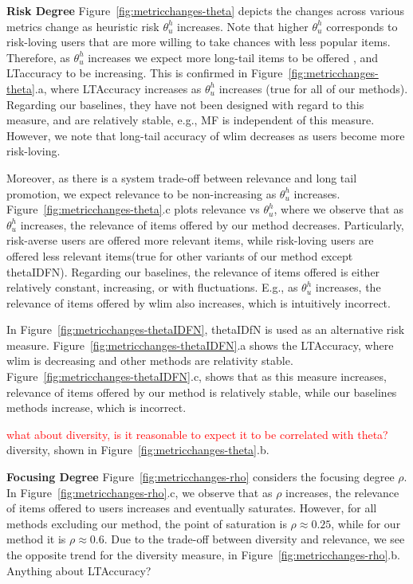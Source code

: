 \textbf{Risk Degree}
Figure~\ref{fig:metricchanges-theta} depicts the changes across various metrics change as heuristic risk $\theta_u^h$ increases. Note that higher $\theta_u^h$ corresponds to risk-loving users that are  more willing to take chances with less popular items. Therefore, as $\theta_u^h$ increases we expect more long-tail items to be offered , and LTaccuracy to be increasing.  This is confirmed in Figure~\ref{fig:metricchanges-theta}.a, where LTAccuracy increases as $\theta_u^h$ increases (true for all of our methods). Regarding our baselines,  they have not been designed with regard to this measure, and are relatively stable, e.g., MF is independent of this measure. However, we note that long-tail accuracy of wlim decreases as users become more risk-loving.

Moreover, as there is a system trade-off between relevance and long tail promotion,  we expect relevance to be non-increasing as  $\theta_u^h$ increases. Figure~\ref{fig:metricchanges-theta}.c plots relevance vs $\theta_u^h$, where we observe that as  $\theta_u^h$ increases, the relevance of items offered by our method decreases. Particularly,  risk-averse users are offered more relevant items, while  risk-loving users are offered less  relevant items(true for other variants of our method except thetaIDFN). Regarding our baselines, the relevance of items offered is either relatively constant, increasing,  or with fluctuations. E.g.,  as $\theta_u^h$ increases, the relevance of items offered by wlim also increases, which is intuitively incorrect. 

In Figure~\ref{fig:metricchanges-thetaIDFN}, thetaIDfN is used as an alternative risk measure. Figure~\ref{fig:metricchanges-thetaIDFN}.a shows the LTAccuracy, where wlim is decreasing and other methods are relativity stable.  Figure~\ref{fig:metricchanges-thetaIDFN}.c, shows that as this measure increases, relevance of items offered by our method is relatively stable, while our baselines methods increase, which is incorrect.

\textcolor{red}{what about diversity, is it reasonable to expect it to be correlated with theta? } diversity, shown in Figure~\ref{fig:metricchanges-theta}.b. 

\textbf{Focusing Degree} Figure~\ref{fig:metricchanges-rho} considers the focusing degree $\rho$. In Figure~\ref{fig:metricchanges-rho}.c, we observe that as $\rho$ increases, the relevance of items offered to users increases and eventually saturates. However, for all methods excluding our method, the point of saturation is $\rho \approx 0.25$, while for our method it is $\rho \approx 0.6$. Due to the trade-off between diversity and relevance, we see the opposite trend for the diversity measure, in Figure~\ref{fig:metricchanges-rho}.b.  Anything about LTAccuracy? 

